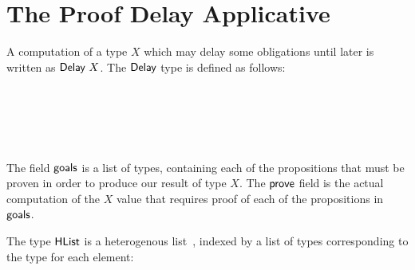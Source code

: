 \documentclass[sigplan]{acmart}%
\begin{document}
\section{The Proof Delay Applicative}\label{sec:proofdelay}
A computation of a type $X$ which may delay some obligations until later is written 
as $\AgdaDatatype{Delay}\ X$. The $\AgdaDatatype{Delay}$ type is defined as follows:
\begin{code}
\>[2]\AgdaSpace{}%
\AgdaSpace{}%
\AgdaSymbol{(}\AgdaSpace{}%
\AgdaSymbol{:}\AgdaSpace{}%
\AgdaSpace{}%
\AgdaSymbol{)}\AgdaSpace{}%
\AgdaSymbol{:}\AgdaSpace{}%
\AgdaSpace{}%
\AgdaSymbol{(}\AgdaSpace{}%
\AgdaSymbol{)}\AgdaSpace{}%
\<%
\\
\>[2][@{}l@{\AgdaIndent{0}}]%
\>[5]\AgdaSpace{}%
\<%
\\
%
\>[5]\<%
\\
\>[5][@{}l@{\AgdaIndent{0}}]%
\>[7]\AgdaSpace{}%
\AgdaSymbol{:}\AgdaSpace{}%
\AgdaSpace{}%
\<%
\\
%
\>[7]\AgdaSpace{}%
\AgdaSymbol{:}\AgdaSpace{}%
\AgdaSpace{}%
\AgdaSpace{}%
\AgdaSpace{}%
\<%
\end{code}
The field $\AgdaField{goals}$ is a list of types, containing 
each of the propositions that must be proven in order to produce our 
result of type $X$. The $\AgdaField{prove}$ field is the actual computation
of the $X$ value that requires proof of each of the propositions
in $\AgdaField{goals}$.

The type $\AgdaDatatype{HList}$ is a heterogenous list~\citep{hlist}, indexed by a list 
of types corresponding to the type for each element:
\begin{code}
\>[2]\AgdaSpace{}%
\AgdaSpace{}%
\AgdaSymbol{:}\AgdaSpace{}%
\AgdaSpace{}%
\AgdaSpace{}%
\AgdaSpace{}%
\AgdaSpace{}%
\<%
\\
\>[2][@{}l@{\AgdaIndent{0}}]%
\>[4]\AgdaInductiveConstructor{[]}\AgdaSpace{}%
\AgdaSymbol{:}\AgdaSpace{}%
\AgdaSpace{}%
\AgdaInductiveConstructor{[]}\<%
\\
%
\>[4]\AgdaSpace{}%
\AgdaSymbol{:}\AgdaSpace{}%
\AgdaSymbol{\}\{}\AgdaSymbol{\}}\AgdaSpace{}%
\AgdaSpace{}%
\AgdaSpace{}%
\AgdaSpace{}%
\AgdaSpace{}%
\AgdaSpace{}%
\AgdaSpace{}%
\AgdaSpace{}%
\AgdaSymbol{(}\AgdaSpace{}%
\AgdaSpace{}%
\AgdaSymbol{)}\<%
\end{code}
\end{document}

